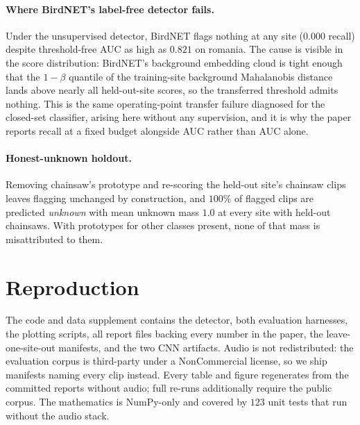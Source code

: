 \documentclass[letterpaper]{article}
\begin{document}
\paragraph{Where BirdNET's label-free detector fails.} Under the unsupervised
detector, BirdNET flags nothing at any site ($0.000$ recall) despite
threshold-free AUC as high as $0.821$ on romania. The cause is visible in the
score distribution: BirdNET's background embedding cloud is tight enough that the
$1-\beta$ quantile of the training-site background Mahalanobis distance lands
above nearly all held-out-site scores, so the transferred threshold admits
nothing. This is the same operating-point transfer failure diagnosed for the
closed-set classifier, arising here without any supervision, and it is why the
paper reports recall at a fixed budget alongside AUC rather than AUC alone.

\paragraph{Honest-unknown holdout.} Removing chainsaw's prototype and re-scoring
the held-out site's chainsaw clips leaves flagging unchanged by construction, and
$100\%$ of flagged clips are predicted \emph{unknown} with mean unknown mass
$1.0$ at every site with held-out chainsaws. With prototypes for other classes
present, none of that mass is misattributed to them.

\section{Reproduction}

The code and data supplement contains the detector, both evaluation harnesses,
the plotting scripts, all report files backing every number in the paper, the
leave-one-site-out manifests, and the two CNN artifacts. Audio is not
redistributed: the evaluation corpus is third-party under a NonCommercial
license, so we ship manifests naming every clip instead. Every table and figure
regenerates from the committed reports without audio; full re-runs additionally
require the public corpus. The mathematics is NumPy-only and covered by $123$
unit tests that run without the audio stack.


\end{document}
